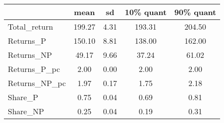 \begin{tabular}{lcccc}
\toprule
{} &    mean &    sd &  10\% quant &  90\% quant \\
\midrule
Total\_return  &  199.27 &  4.31 &     193.31 &     204.50 \\
Returns\_P     &  150.10 &  8.81 &     138.00 &     162.00 \\
Returns\_NP    &   49.17 &  9.66 &      37.24 &      61.02 \\
Returns\_P\_pc  &    2.00 &  0.00 &       2.00 &       2.00 \\
Returns\_NP\_pc &    1.97 &  0.17 &       1.75 &       2.18 \\
Share\_P       &    0.75 &  0.04 &       0.69 &       0.81 \\
Share\_NP      &    0.25 &  0.04 &       0.19 &       0.31 \\
\bottomrule
\end{tabular}
